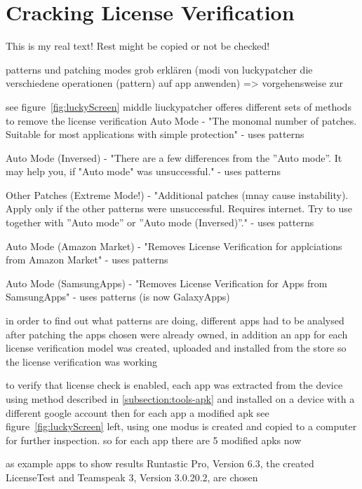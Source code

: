 \section{Cracking License Verification} \label{section:luckypatcher-modi}
This is my real text! Rest might be copied or not be checked!



%
patterns und patching modes grob erklären (modi von luckypatcher die verschiedene operationen (pattern) auf app anwenden) => vorgehensweise zur\newline

see figure~\ref{fig:luckyScreen} middle liuckypatcher offeres different sets of methods to remove the license verification
Auto Mode - "The monomal number of patches. Suitable for most applications with simple protection" - uses patterns

Auto Mode (Inversed) - "There are a few differences from the ”Auto mode”. It may help you, if "Auto mode" was unsuccessful." - uses patterns

Other Patches (Extreme Mode!) - "Additional patches (mnay cause instability). Apply only if the other patterns were unsuccessful. Requires internet. Try to use together with ”Auto mode” or ”Auto mode (Inversed)”." - uses patterns

Auto Mode (Amazon Market) - "Removes License Verification for applciations from Amazon Market" - uses patterns

Auto Mode (SamsungApps) - "Removes License Verification for Apps from SamsungApps" - uses patterns  (is now GalaxyApps)


in order to find out what patterns are doing, different apps had to be analysed after patching
the apps chosen were already owned, in addition an app for each license verification model was created, uploaded and installed from the store so the license verification was working

to verify that license check is enabled, each app was extracted from the device using method described in \ref{subsection:tools-apk} and installed on a device with a different google account
then for each app a modified apk see figure~\ref{fig:luckyScreen} left, using one modus is created and copied to a computer for further inspection. so for each app there are 5 modified apks now


as example apps to show results Runtastic Pro\cite{runtasticApp}, Version 6.3, the created LicenseTest and Teamspeak 3\cite{teamspeakApp}, Version 3.0.20.2, are chosen

